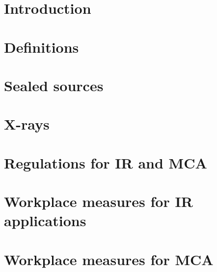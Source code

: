 \section{Introduction}
\section{Definitions}
\section{Sealed sources}
\section{X-rays}
\section{Regulations for IR and MCA}
\section{Workplace measures for IR applications}
\section{Workplace measures for MCA}